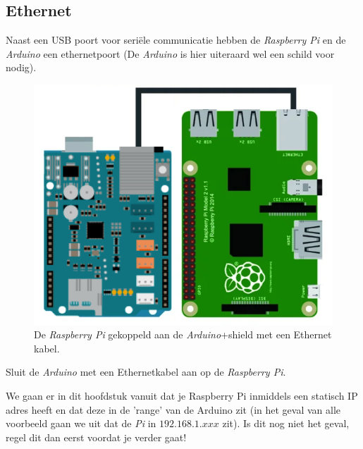 \newpage

\subsection{Ethernet}
Naast een USB poort voor seriële communicatie hebben de \textit{Raspberry Pi} en de \textit{Arduino} een ethernetpoort (De \textit{Arduino} is hier uiteraard wel een schild voor nodig). 

\begin{figure}[h!]
\centering\includegraphics[scale=0.5]{Pictures/chapter08/ethernet.png}
\caption{\small De \textit{Raspberry Pi} gekoppeld aan de \textit{Arduino}+shield met een Ethernet kabel.}
\label{fig:ethernet} %
\end{figure}

\begin{exercise}
Sluit de \textit{Arduino} met een Ethernetkabel aan op de \textit{Raspberry Pi}.
\end{exercise}

\begin{remark}
  We gaan er in dit hoofdstuk vanuit dat je Raspberry Pi inmiddels een statisch IP adres heeft en dat deze in de 'range' van de Arduino zit (in het geval van alle voorbeeld gaan we uit dat de \textit{Pi} in $192.168.1.xxx$ zit). Is dit nog niet het geval, regel dit dan eerst voordat je verder gaat!
\end{remark}

